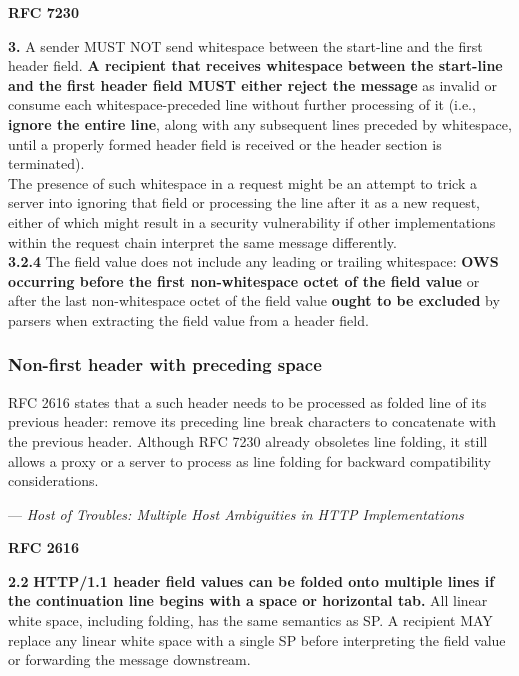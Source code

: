 \textbf{RFC 7230}
\columnseprule=1pt    %
\begin{multicols}{2}
	\begin{spacing}{0.8}
		\textbf{3.} 
		{\footnotesize 
		A sender MUST NOT send whitespace between the start-line and the
		first header field. \textbf{A recipient that receives whitespace between the start-line and the first header field MUST either reject the message} as invalid or consume each whitespace-preceded line without further processing of it (i.e., \textbf{ignore the entire line}, along with any subsequent lines preceded by whitespace, until a properly formed header field is received or the header section is terminated).\vspace{1ex} \\ 
		The presence of such whitespace in a request might be an attempt to trick a server into ignoring that field or processing the line after it as a new request, either of which might result in a security vulnerability if other implementations within the request chain interpret the same message differently.\\	
		}
		\textbf{3.2.4} 
	    {\footnotesize  The field value does not include any leading or trailing whitespace: \textbf{OWS occurring before the first non-whitespace octet of the field value} or after the last non-whitespace octet of the field value \textbf{ought to be excluded} by parsers when extracting the field value from a header field.}
	\end{spacing}
\end{multicols}

\subsubsection{Non-first header with preceding space}
RFC 2616 states that a such header needs to be processed as folded line of its previous header: remove its preceding line break characters to concatenate with the
previous header. Although RFC 7230 already obsoletes line folding, it still allows a proxy or a server to process as line folding for backward compatibility considerations.

\hspace{1 cm}--- \textit{Host of Troubles: Multiple Host Ambiguities in HTTP Implementations}

\textbf{RFC 2616}
\columnseprule=1pt    %
\begin{multicols}{2}
	\begin{spacing}{0.8}
		\textbf{2.2} 
		{\footnotesize  \textbf{HTTP/1.1 header field values can be folded onto multiple lines if the continuation line begins with a space or horizontal tab.} All linear white space, including folding, has the same semantics as SP. A recipient MAY replace any linear white space with a single SP before interpreting the field value or forwarding the message downstream. }
	\end{spacing}
\end{multicols}

